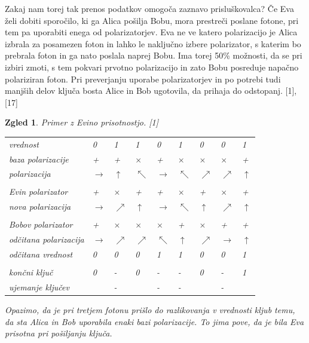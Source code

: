 \documentclass[A4paper, 11pt]{article}
\newtheorem{zgled}{Zgled}
\newcommand{\cmark}{\ding{51}}
\newcommand{\xmark}{\ding{55}}
\begin{document}
Zakaj nam torej tak prenos podatkov omogoča zaznavo prisluškovalca?
Če Eva želi dobiti sporočilo, ki ga Alica pošilja Bobu, mora prestreči poslane fotone, pri tem pa uporabiti enega od polarizatorjev. Eva ne ve katero polarizacijo je Alica izbrala za posamezen foton in lahko le naključno izbere polarizator, s katerim bo prebrala foton in ga nato poslala naprej Bobu. Ima torej 50\% možnosti, da se pri izbiri zmoti, s tem pokvari prvotno polarizacijo in zato Bobu posreduje napačno polariziran foton. Pri preverjanju uporabe polarizatorjev in po potrebi tudi manjših delov ključa bosta Alice in Bob ugotovila, da prihaja do odstopanj. [1],[17]

\begin{zgled} 
Primer z Evino prisotnostjo. [1]

\begin{center}
\begin{tabular}{ l m{0.3 cm} m{0.3 cm} m{0.3 cm} m{0.3 cm} m{0.3 cm} m{0.3 cm} m{0.3 cm} m{0.3 cm}}
vrednost & 0 & 1 & 1 & 0 & 1 & 0 & 0 & 1\\
baza polarizacije & + & + & $\times$ & + & $\times$ & $\times$ & $\times$ & + \\
polarizacija & $\rightarrow$ & $\uparrow$ & $\nwarrow$ & $\rightarrow$ & $\nwarrow$ & $\nearrow$ & $\nearrow$  & $\uparrow$\\
\\
Evin polarizator & + & $\times$ & + & + & $\times$ & + & $\times$ & +\\
nova polarizacija & $\rightarrow$ & $\nearrow$ & $\uparrow$ & $\rightarrow$ & $\nwarrow$  & $\uparrow$ & $\nearrow$ & $\uparrow$\\
\\
Bobov polarizator & + & $\times$ & $\times$ & $\times$ & + & $\times$ & + & +\\
odčitana polarizacija & $\rightarrow$ & $\nearrow$ & $\nearrow$ & $\nwarrow$ & $\uparrow$  & $\nearrow$ & $\rightarrow$ & $\uparrow$\\
odčitana vrednost & 0 & 0 & 0 & 1 & 1 & 0 & 0 & 1\\
\\
končni ključ & 0 & - & 0 & - & - & 0 & - & 1\\
ujemanje ključev & \cmark & - & \xmark & - & - & \cmark & - & \cmark\\ 
\end{tabular}
\end{center}

Opazimo, da je pri tretjem fotonu prišlo do razlikovanja v vrednosti kljub temu, da sta Alica in Bob uporabila enaki bazi polarizacije. To jima pove, da je bila Eva prisotna pri pošiljanju ključa.

\end{zgled}
\end{document}
